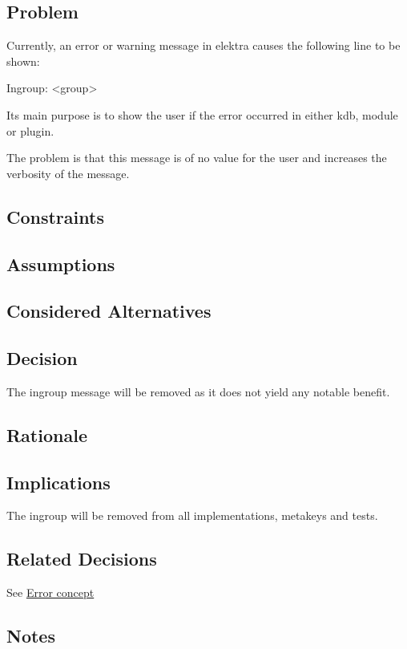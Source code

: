 \subsection*{Problem}

Currently, an error or warning message in elektra causes the following line to be shown\+:


\begin{DoxyCode}
Ingroup: <group>
\end{DoxyCode}


Its main purpose is to show the user if the error occurred in either {\ttfamily kdb}, {\ttfamily module} or {\ttfamily plugin}.

The problem is that this message is of no value for the user and increases the verbosity of the message.

\subsection*{Constraints}

\subsection*{Assumptions}

\subsection*{Considered Alternatives}

\subsection*{Decision}

The {\ttfamily ingroup} message will be removed as it does not yield any notable benefit.

\subsection*{Rationale}

\subsection*{Implications}

The {\ttfamily ingroup} will be removed from all implementations, metakeys and tests.

\subsection*{Related Decisions}

See \hyperlink{doc_decisions_error_codes_md}{Error concept}

\subsection*{Notes}